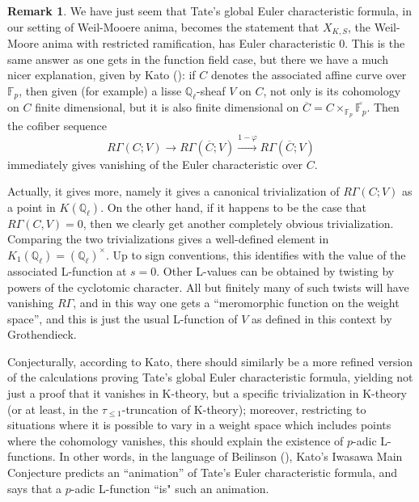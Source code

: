 \documentclass[12pt]{article}
\theoremstyle{definition}
\newtheorem{remark}[theorem]{Remark}
\newcommand{\mbb}{\mathbb}
\begin{document}
\begin{remark}
We have just seem that Tate's global Euler characteristic formula, in our setting of Weil-Mooere anima, becomes the statement that $X_{K,S}$, the Weil-Moore anima with restricted ramification, has Euler characteristic $0$.  This is the same answer as one gets in the function field case, but there we have a much nicer explanation, given by Kato (\cite{kato}): if $C$ denotes the associated affine curve over $\mbb{F}_p$, then given (for example) a lisse $\mbb{Q}_\ell$-sheaf $V$ on $C$, not only is its cohomology on $C$ finite dimensional, but it is also finite dimensional on $\overline{C}=C\times_{\mbb{F}_p}\overline{\mbb{F}_p}$.  Then the cofiber sequence
$$R\Gamma(C;V) \to R\Gamma(\overline{C};V) \overset{1-\varphi}{\longrightarrow} R\Gamma(\overline{C};V)$$
immediately gives vanishing of the Euler characteristic over $C$.

Actually, it gives more, namely it gives a canonical trivialization of $R\Gamma(C;V)$ as a point in $K(\mbb{Q}_\ell)$.  On the other hand, if it happens to be the case that $R\Gamma(C,V)=0$, then we clearly get another completely obvious trivialization.  Comparing the two trivializations gives a well-defined element in $K_1(\mbb{Q}_\ell)=(\mbb{Q}_\ell)^\times$.  Up to sign conventions, this identifies with the value of the associated L-function at $s=0$.  Other L-values can be obtained by twisting by powers of the cyclotomic character.  All but finitely many of such twists will have vanishing $R\Gamma$, and in this way one gets a ``meromorphic function on the weight space'', and this is just the usual L-function of $V$ as defined in this context by Grothendieck.

Conjecturally, according to Kato, there should similarly be a more refined version of the calculations proving Tate's global Euler characteristic formula, yielding not just a proof that it vanishes in K-theory, but a specific trivialization in K-theory (or at least, in the $\tau_{\leq 1}$-truncation of K-theory); moreover, restricting to situations where it is possible to vary in a weight space which includes points where the cohomology vanishes, this should explain the existence of $p$-adic L-functions.  In other words, in the language of Beilinson (\cite{beilinson}), Kato's Iwasawa Main Conjecture predicts an ``animation'' of Tate's Euler characteristic formula, and says that a $p$-adic L-function ``is" such an animation.
\end{remark}
\end{document}
